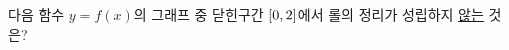 다음 함수 $y=f(x)$의 그래프 중 닫힌구간 $[0{,}\mkern3mu\mathopen{}2]$에서 롤의 정리가 성립하지 \underline{않는} 것은?
\par\smallskip\begin{center}\resizebox{\ifdim\width>\linewidth\linewidth\else\width\fi}{!}{}\end{center}
